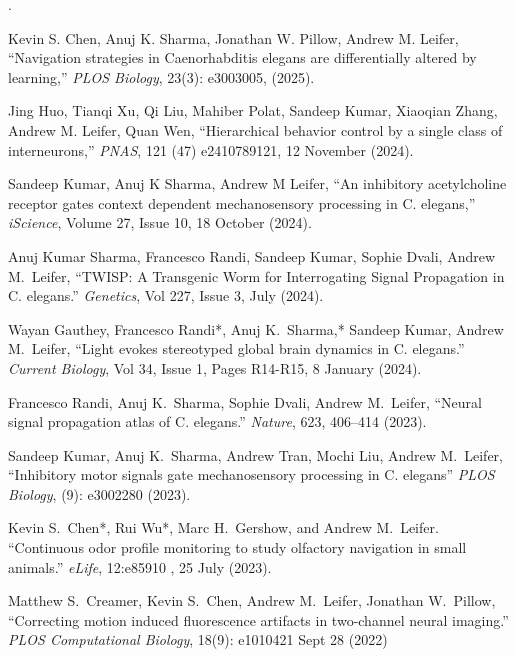 \documentclass[11pt]{article}
\makeatletter
\newlength{\bibhang}
\newlength{\bibsep}
\newcounter{Lcount}
 {\@listi \global\bibsep\itemsep \global\advance\bibsep by\parsep}
\newenvironment{bibsection}%
        {\begin{list}{\arabic{Lcount}.}{%
       \usecounter{Lcount}%
       \setlength\labelwidth{-0.5em}%
       \setlength{\leftmargin}{\bibhang}%
       \setlength{\itemindent}{-\leftmargin}%
       \setlength{\itemsep}{\bibsep}%
       \setlength{\parsep}{\z@}%
        \setlength{\partopsep}{0pt}%
        \setlength{\topsep}{0pt}}}
        {\end{list}\vspace{-.6\baselineskip}}
\makeatother
\begin{document}
\begin{bibsection}
\item Kevin S. Chen, Anuj K. Sharma, Jonathan W. Pillow, Andrew M. Leifer, ``Navigation strategies in Caenorhabditis elegans are differentially altered by learning,'' \textit{PLOS Biology}, 23(3): e3003005, (2025).

\item Jing Huo, Tianqi Xu, Qi Liu, Mahiber Polat, Sandeep Kumar, Xiaoqian Zhang, Andrew M. Leifer, Quan Wen, ``Hierarchical behavior control by a single class of interneurons,'' \textit{PNAS}, 121 (47) e2410789121, 12 November (2024).

\item Sandeep Kumar, Anuj K Sharma, Andrew M Leifer, ``An inhibitory acetylcholine receptor gates context dependent mechanosensory processing in C. elegans,'' \textit{iScience}, Volume 27, Issue 10, 18 October (2024).

\item Anuj Kumar Sharma, Francesco Randi, Sandeep Kumar, Sophie Dvali, Andrew M.~Leifer, ``TWISP: A Transgenic Worm for Interrogating Signal Propagation in C. elegans.'' \textit{Genetics}, Vol 227, Issue 3, July (2024).


\item Wayan Gauthey, Francesco Randi*, Anuj K.~Sharma,* Sandeep Kumar, Andrew M.~Leifer, ``Light evokes stereotyped global brain dynamics in C. elegans.'' \textit{Current Biology}, Vol 34, Issue 1, Pages R14-R15, 8 January (2024).

\item Francesco Randi, Anuj K.~Sharma, Sophie Dvali, Andrew M.~Leifer, ``Neural signal propagation atlas of C. elegans.'' \textit{Nature},  623, 406–414  (2023).

\item Sandeep Kumar,  Anuj K.~Sharma, Andrew Tran, Mochi Liu, Andrew M.~Leifer, ``Inhibitory motor signals gate mechanosensory processing in C. elegans'' \textit{PLOS Biology},  (9): e3002280 (2023).


\item Kevin S.~Chen*, Rui Wu*, Marc H.~Gershow, and Andrew M.~Leifer. ``Continuous odor profile monitoring to study olfactory navigation in small animals.'' \textit{eLife}, 12:e85910 , 25 July (2023).

\item Matthew S.~Creamer, Kevin S.~Chen, Andrew M.~Leifer, Jonathan W.~Pillow, ``Correcting motion induced fluorescence artifacts in two-channel neural imaging.'' \textit{PLOS Computational Biology},  18(9): e1010421  Sept 28 (2022)


\end{bibsection}
\end{document}
